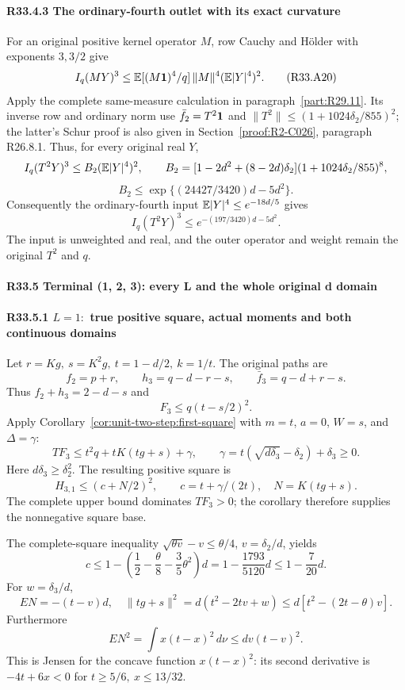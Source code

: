 \paragraph{R33.4.3 The ordinary-fourth outlet with its exact curvature}
For an original positive kernel operator \(M\), row Cauchy and
H\"older with exponents \(3,3/2\) give
\[
 I_q(MY)^3\le\mathbb E[(M\mathbf1)^4/q]\,\|M\|^4(\mathbb E|Y|^4)^2.
 \tag{R33.A20}
\]
Apply the complete same-measure calculation in
paragraph~\ref{part:R29.11}. Its inverse row and ordinary norm use
\(\bar f_2=T^2\mathbf1\) and
\(\|T^2\|\le(1+1024\delta_2/855)^2\); the latter's Schur
proof is also given in Section~\ref{proof:R2-C026}, paragraph R26.8.1.
Thus, for every original real \(Y\),
\[
 I_q(T^2Y)^3\le B_2(\mathbb E|Y|^4)^2,\qquad
 B_2=[1-2d^2+(8-2d)\delta_2](1+1024\delta_2/855)^8,
\]
\[
 B_2\le\exp\{(24427/3420)d-5d^2\}.\tag{R33.A21}
\]
Consequently the ordinary-fourth input \(\mathbb E|Y|^4\le e^{-18d/5}\)
gives
\[
 I_q(T^2Y)^3\le e^{-(197/3420)d-5d^2}.\tag{R33.A22}
\]
The input is unweighted and real, and the outer operator and weight
remain the original \(T^2\) and \(q\).

\paragraph{R33.5 Terminal (1, 2, 3): every L and the whole original d domain}\label{part:R33.5}

\paragraph{R33.5.1 \(L=1:\) true positive square, actual moments and both continuous domains}

Let \(r=Kg,\allowbreak \allowbreak  \ s=K^2g,\allowbreak \allowbreak  \ t=1-d/2,\allowbreak \allowbreak  \ k=1/t\). The original paths are
\[
f_2=p+r,\qquad h_3=q-d-r-s,\qquad \bar f_3=q-d+r-s.
\]
Thus \(f_2+h_3=2-d-s\) and
\[
F_3\le q(t-s/2)^2.
\]
Apply Corollary~\ref{cor:unit-two-step:first-square} with
$m=t$, $a=0$, $W=s$, and $\Delta=\gamma$:
\[
 TF_3\le t^2q+tK(tg+s)+\gamma,\qquad
 \gamma=t(\sqrt{d\delta_3}-\delta_2)+\delta_3\ge0.
 \tag{R33.A23}
\]
Here $d\delta_3\ge\delta_2^2$. The resulting positive square is
\[
 H_{3,1}\le(c+N/2)^2,\qquad
 c=t+\gamma/(2t),\quad N=K(tg+s).\tag{R33.A24}
\]
The complete upper bound dominates $TF_3>0$; the corollary
therefore supplies the nonnegative square base.

The complete-square inequality
\(\sqrt{\theta v}-v\le\theta/4\), \(v=\delta_2/d\), yields
\[
c\le1-\left(\frac12-\frac{\theta}{8}
-\frac35\theta^2\right)d
=1-\frac{1793}{5120}d\le1-\frac7{20}d.
\]
For \(w=\delta_3/d\),
\[
EN=-(t-v)d,\quad
\|tg+s\|^2=d(t^2-2tv+w)\le d[t^2-(2t-\theta)v].
\]
Furthermore
\[
EN^2=\int x(t-x)^2\,d\nu\le dv(t-v)^2.            \tag{R33.A25}
\]
This is Jensen for the concave function \(x(t-x)^2\):
its second derivative is \(-4t+6x<0\) for
\(t\ge5/6,\allowbreak \allowbreak  \ x\le13/32\).

